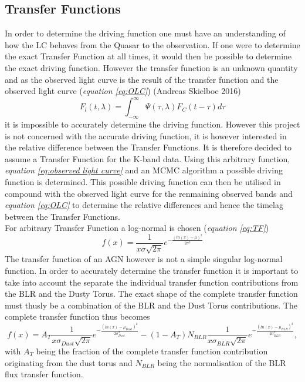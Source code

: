 \documentclass[a4paper, 12pt, twoside]{article}
\begin{document}
\subsection{Transfer Functions}
In order to determine the driving function one must have an understanding of how the LC behaves from the Quasar to the observation. If one were to determine the exact Transfer Function at all times, it would then be possible to determine the exact driving function. However the transfer function is an unknown quantity and as the observed light curve is the result of the transfer function and the observed light curve (\emph{equation \ref{eq:OLC}}) (Andreas Skielboe 2016)
\begin{equation}
F_l(t,\lambda) = \int_{-\infty}^{\infty}\Psi(\tau,\lambda)F_C(t-\tau)d\tau
\label{eq:OLC}
\end{equation}
it is impossible to accurately determine the driving function. However this project is not concerned with the accurate driving function, it is however interested in the relative difference between the Transfer Functions. It is therefore decided to assume a Transfer Function for the K-band data. Using this arbitrary function, \emph{equation \ref{eq:observed light curve}} and an MCMC algorithm a possible driving function is determined. This possible driving function can then be utilised in compound with the observed light curve for the renmaining observed bands and \emph{equation \ref{eq:OLC}} to determine the relative differences and hence the timelag between the Transfer Functions. \\
For arbitrary Transfer Function a log-normal is chosen (\emph{equation \ref{eq:TF}})
\begin{equation}
f(x) = \frac{1}{x\sigma\sqrt{2\pi}}e^{-\frac{(ln(x)-\mu)^2}{2\sigma^2}}
\label{eq:TF}
\end{equation}
The transfer function of an AGN however is not a simple singular log-normal function. In order to accurately determine the transfer function it is important to take into account the separate the individual transfer function contributions from the BLR and the Dusty Torus. The exact shape of the complete transfer function must thusly be a combination of the BLR and the Dust Torus contributions. The complete transfer function thus becomes
\begin{equation}
f(x) = A_{T}\frac{1}{x\sigma_{Dust}\sqrt{2\pi}}e^{-\frac{(ln(x)-\mu_{Dust})^2}{2\sigma_{Dust}^2}} - (1 - A_{T})N_{BLR}\frac{1}{x\sigma_{BLR}\sqrt{2\pi}}e^{-\frac{(ln(x)-\mu_{BLR})^2}{2\sigma_{BLR}^2}},
\label{eq:TF_full}
\end{equation}
with $A_{T}$ being the fraction of the complete transfer function contribution originating from the dust torus and $N_{BLR}$ being the normalisation of the BLR flux transfer function. 
\end{document}
